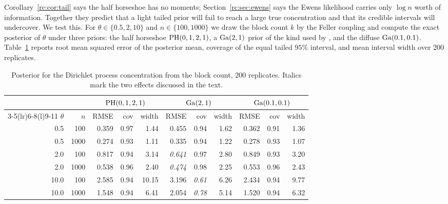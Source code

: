 Corollary~\ref{rc:cor:tail} says the half horseshoe has no moments; Section~\ref{rc:sec:ewens} says the Ewens likelihood carries only $\log n$ worth of information. Together they predict that a light tailed prior will fail to reach a large true concentration and that its credible intervals will undercover. We test this. For $\theta\in\{0.5,2,10\}$ and $n\in\{100,1000\}$ we draw the block count $k$ by the Feller coupling and compute the exact posterior of $\theta$ under three priors: the half horseshoe $\mathrm{PH}(0,1,2,1)$, a $\mathrm{Ga}(2,1)$ prior of the kind used by \citet{rc:escobar1995}, and the diffuse $\mathrm{Ga}(0.1,0.1)$. Table~\ref{rc:tab:sim} reports root mean squared error of the posterior mean, coverage of the equal tailed $95\%$ interval, and mean interval width over 200 replicates.

\begin{table}[htbp]
\centering\footnotesize
\setlength{\tabcolsep}{2.4pt}
\begin{tabular}{@{}rrrrrrrrrrr@{}}
\toprule
 & & \multicolumn{3}{c}{$\mathrm{PH}(0,1,2,1)$} & \multicolumn{3}{c}{$\mathrm{Ga}(2,1)$} & \multicolumn{3}{c}{$\mathrm{Ga}(0.1,0.1)$}\\
\cmidrule(lr){3-5}\cmidrule(lr){6-8}\cmidrule(l){9-11}
$\theta$ & $n$ & RMSE & cov & width & RMSE & cov & width & RMSE & cov & width\\
\midrule
0.5 & 100 & 0.359 & 0.97 & 1.44 & 0.455 & 0.94 & 1.62 & 0.362 & 0.91 & 1.36\\
0.5 & 1000 & 0.274 & 0.93 & 1.11 & 0.335 & 0.94 & 1.22 & 0.278 & 0.93 & 1.07\\
2.0 & 100 & 0.817 & 0.94 & 3.14 & \emph{0.641} & 0.97 & 2.80 & 0.849 & 0.93 & 3.20\\
2.0 & 1000 & 0.538 & 0.96 & 2.40 & \emph{0.474} & 0.98 & 2.25 & 0.553 & 0.96 & 2.43\\
10.0 & 100 & 2.585 & 0.94 & 10.15 & 3.196 & \emph{0.61} & 6.26 & 2.434 & 0.94 & 9.77\\
10.0 & 1000 & 1.548 & 0.94 & 6.41 & 2.054 & \emph{0.78} & 5.14 & 1.520 & 0.94 & 6.32\\
\bottomrule
\end{tabular}
\caption{Posterior for the Dirichlet process concentration from the block count, 200 replicates. Italics mark the two effects discussed in the text.}\label{rc:tab:sim}
\end{table}

